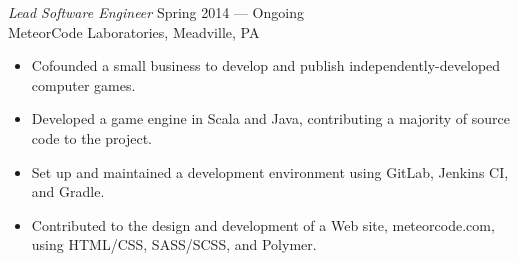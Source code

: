 \documentclass[margin]{res}
\begin{document}
\begin{resume}
                {\sl Lead Software Engineer} \hfill  Spring 2014 --- Ongoing \\
                MeteorCode Laboratories, Meadville, PA
                 \begin{itemize}  \itemsep -2pt %
                    \item Cofounded a small business to develop and publish independently-developed computer games. 
                    \item Developed a game engine in Scala and Java, contributing a majority of source code to the project.
                    \item Set up and maintained a development environment using GitLab, Jenkins CI, and Gradle.
		\item Contributed to the design and development of a Web site, meteorcode.com, using HTML/CSS, SASS/SCSS, and Polymer.
                 \end{itemize}
                
 


\end{resume}
\end{document}
